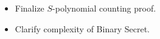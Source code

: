 \begin{itemize}
    \item Finalize $S$-polynomial counting proof.
    \item Clarify complexity of Binary Secret.
\end{itemize}

